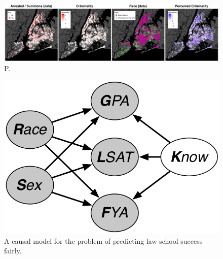 \begin{figure}[th]
\begin{center}
\vspace{-2ex}
\centerline{\includegraphics[width=\textwidth]{stop_and_frisk_graphs.png}}
\vspace{-2ex}
\caption{P.}
\label{figure.criminality}
\vspace{-2ex}
\end{center}
\end{figure}

\begin{figure}[th]
\begin{center}
\vspace{-1ex}
\centerline{\includegraphics[width=0.8\columnwidth]{law_school_model}}
\vspace{-2ex}
\caption{A causal model for the problem of predicting law school success fairly.\label{figure.law_school}}
\vspace{-2ex}
\end{center}
\end{figure}


